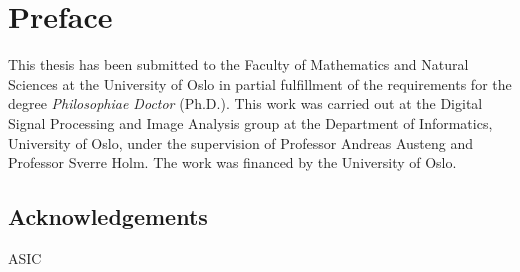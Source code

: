 \ifMonolithic\else\fi


\chapter*{Preface}

This thesis has been submitted to the Faculty of Mathematics and Natural Sciences at the University of Oslo in partial fulfillment of the requirements for the degree \emph{Philosophiae Doctor} (Ph.D.). This work was carried out at the Digital Signal Processing and Image Analysis group at the Department of Informatics, University of Oslo, under the supervision of Professor Andreas Austeng and Professor Sverre Holm. The work was financed by the University of Oslo.

\section*{Acknowledgements}


\gls{ASIC}



\ifMonolithic\else\fi